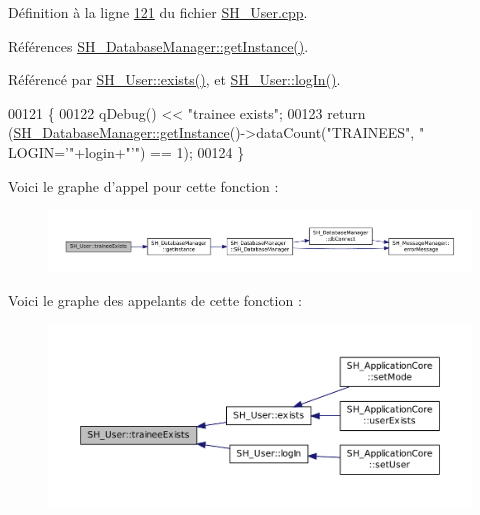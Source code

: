 Définition à la ligne \hyperlink{SH__User_8cpp_source_l00121}{121} du fichier \hyperlink{SH__User_8cpp_source}{S\-H\-\_\-\-User.\-cpp}.



Références \hyperlink{classSH__DatabaseManager_a638369a15265ab0aa053080a32d2ca39}{S\-H\-\_\-\-Database\-Manager\-::get\-Instance()}.



Référencé par \hyperlink{classSH__User_aa83a99478cf6c738f995c5c36345bcd3}{S\-H\-\_\-\-User\-::exists()}, et \hyperlink{classSH__User_ad83af309786cb1ed5dbbd2cdca195c30}{S\-H\-\_\-\-User\-::log\-In()}.


\begin{DoxyCode}
00121                                          \{
00122     qDebug() << \textcolor{stringliteral}{"trainee exists"};
00123     \textcolor{keywordflow}{return} (\hyperlink{classSH__DatabaseManager_a638369a15265ab0aa053080a32d2ca39}{SH\_DatabaseManager::getInstance}()->dataCount(\textcolor{stringliteral}{"TRAINEES"}, \textcolor{stringliteral}{"
      LOGIN='"}+login+\textcolor{stringliteral}{"'"}) == 1);
00124 \}
\end{DoxyCode}


Voici le graphe d'appel pour cette fonction \-:
\nopagebreak
\begin{figure}[H]
\begin{center}
\leavevmode
\includegraphics[width=350pt]{classSH__User_af40edc91cf1a4d8065fb43d2899c3dcb_cgraph}
\end{center}
\end{figure}




Voici le graphe des appelants de cette fonction \-:
\nopagebreak
\begin{figure}[H]
\begin{center}
\leavevmode
\includegraphics[width=350pt]{classSH__User_af40edc91cf1a4d8065fb43d2899c3dcb_icgraph}
\end{center}
\end{figure}


